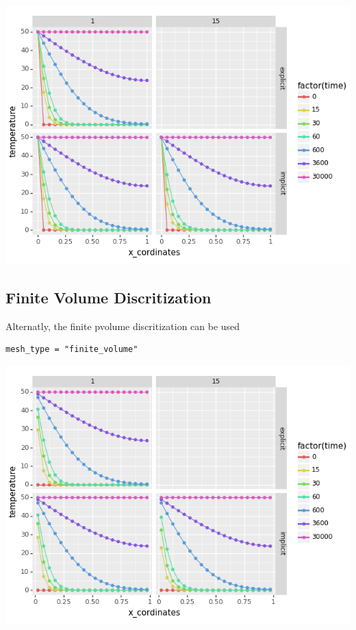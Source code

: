 \documentclass[letterpaper, 11pt]{article}
\begin{document}
\begin{center}
\includegraphics[width=.9\linewidth]{finite_difference.png}
\end{center}
\newpage

\subsection{Finite Volume Discritization}
\label{sec:orgb092d6b}

Alternatly, the finite pvolume discritization can be used
\begin{verbatim}
mesh_type = "finite_volume"
\end{verbatim}

\begin{center}
\includegraphics[width=.9\linewidth]{finite_volume.png}
\end{center}
\end{document}
